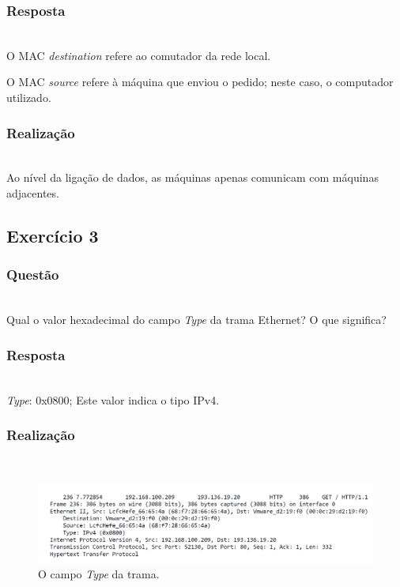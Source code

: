 \documentclass{llncs}
\begin{document}
\subsubsection{Resposta}\rule[-10pt]{0pt}{10pt}\\

O MAC \textit{destination} refere ao comutador da rede local.

O MAC \textit{source} refere à máquina que enviou o pedido; neste caso, o computador utilizado.

\subsubsection{Realização}\rule[-10pt]{0pt}{10pt}\\

Ao nível da ligação de dados, as máquinas apenas comunicam com máquinas adjacentes.

\clearpage
\subsection{Exercício 3}
\subsubsection{Questão}\rule[-10pt]{0pt}{10pt}\\

Qual o valor hexadecimal do campo \textit{Type} da trama Ethernet? O que significa?

\subsubsection{Resposta}\rule[-10pt]{0pt}{10pt}\\

\textit{Type}: 0x0800; Este valor indica o tipo IPv4.

\subsubsection{Realização}\rule[-10pt]{0pt}{10pt}\\

\begin{figure}
  \begin{center}
  \includegraphics[scale=0.35]{imagens/MACAddrGET.png} 
  \end{center}
  \caption{O campo \textit{Type} da trama.}
  \label{fig:frame_field}
\end{figure} 
\end{document}

